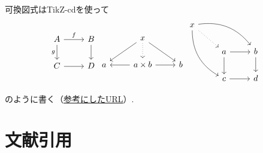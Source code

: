 \documentclass[11pt,a4paper,oneside,lualatex]{ltjsarticle} %
\numberwithin{equation}{section} %
\begin{document}

可換図式はTikZ-cdを使って
\begin{equation}
	\begin{tikzcd}
		A \ar[r, "f"] \arrow[d, "g"'] & B \ar[d] \\
		C \ar[r] & D
	\end{tikzcd}
	\begin{tikzcd}
		& x \arrow[ld] \arrow[d, dotted] \arrow[rd] & \\
		a & a\times b \arrow[l] \arrow[r] & b
	\end{tikzcd}
	\begin{tikzcd}
		x \arrow[ddr, bend right] \arrow[rrd, bend left] \arrow[rd, dotted] & & \\
		& a \arrow[r] \arrow[d] & b \arrow[d] \\
		& c \arrow[r] & d
	\end{tikzcd}
\end{equation}

のように書く（\href{https://blog.miz-ar.info/2017/06/commutative-diagrams-in-latex/}{参考にしたURL}）.

%


\section{文献引用} \label{sec:bib}

\end{document}
